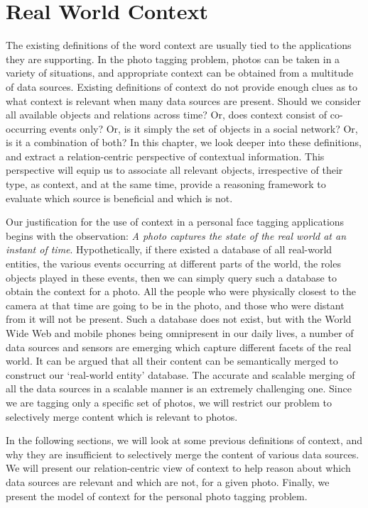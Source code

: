\chapter{Real World Context}

The existing definitions of the word context are usually tied to the applications they are supporting. In the photo tagging problem, photos can be taken in a variety of situations, and appropriate context can be obtained from a multitude of data sources. Existing definitions of context do not provide enough clues as to what context is relevant when many data sources are present. Should we consider all available objects and relations across time? Or, does context consist of co-occurring events only? Or, is it simply the set of objects in a social network? Or, is it a combination of both?  In this chapter, we look deeper into these definitions, and extract a relation-centric perspective of contextual information. This perspective will equip us to associate all relevant objects, irrespective of their type, as context, and at the same time, provide a reasoning framework to evaluate which source is beneficial and which is not.

Our justification for the use of context in a personal face tagging applications begins with the observation: \textit{A photo captures the state of the real world at an instant of time}. Hypothetically, if there existed a database of all real-world entities, the various events occurring at different parts of the world, the roles objects played in these events, then we can simply query such a database to obtain the context for a photo. All the people who were physically closest to the camera at that time are going to be in the photo, and those who were distant from it will not be present. Such a database does not exist, but with the World Wide Web and mobile phones being omnipresent in our daily lives, a number of data sources and sensors are emerging which capture different facets of the real world. It can be argued that all their content can be semantically merged to construct our `real-world entity' database. The accurate and scalable merging of all the data sources in a scalable manner is an extremely challenging one. Since we are tagging only a specific set of photos, we will restrict our problem to selectively merge content which is relevant to photos.

In the following sections, we will look at some previous definitions of context, and why they are insufficient to selectively merge the content of various data sources. We will present our relation-centric view of context to help reason about which data sources are relevant and which are not, for a given photo. Finally, we present the model of context for the personal photo tagging problem.

